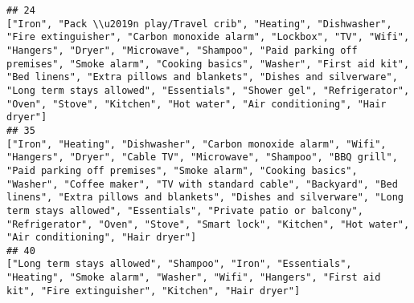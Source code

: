 \documentclass[
]{article}
\begin{document}
\begin{verbatim}
## 24                                                                                                                                                                                                                                                                                                                                                                                                                                                                                                                                      ["Iron", "Pack \\u2019n play/Travel crib", "Heating", "Dishwasher", "Fire extinguisher", "Carbon monoxide alarm", "Lockbox", "TV", "Wifi", "Hangers", "Dryer", "Microwave", "Shampoo", "Paid parking off premises", "Smoke alarm", "Cooking basics", "Washer", "First aid kit", "Bed linens", "Extra pillows and blankets", "Dishes and silverware", "Long term stays allowed", "Essentials", "Shower gel", "Refrigerator", "Oven", "Stove", "Kitchen", "Hot water", "Air conditioning", "Hair dryer"]
## 35                                                                                                                                                                                                                                                                                                                                                                                                                                                                                                                    ["Iron", "Heating", "Dishwasher", "Carbon monoxide alarm", "Wifi", "Hangers", "Dryer", "Cable TV", "Microwave", "Shampoo", "BBQ grill", "Paid parking off premises", "Smoke alarm", "Cooking basics", "Washer", "Coffee maker", "TV with standard cable", "Backyard", "Bed linens", "Extra pillows and blankets", "Dishes and silverware", "Long term stays allowed", "Essentials", "Private patio or balcony", "Refrigerator", "Oven", "Stove", "Smart lock", "Kitchen", "Hot water", "Air conditioning", "Hair dryer"]
## 40                                                                                                                                                                                                                                                                                                                                                                                                                                                                                                                                                                                                                                                                                                                                                                                                                                                          ["Long term stays allowed", "Shampoo", "Iron", "Essentials", "Heating", "Smoke alarm", "Washer", "Wifi", "Hangers", "First aid kit", "Fire extinguisher", "Kitchen", "Hair dryer"]
\end{verbatim}
\end{document}
